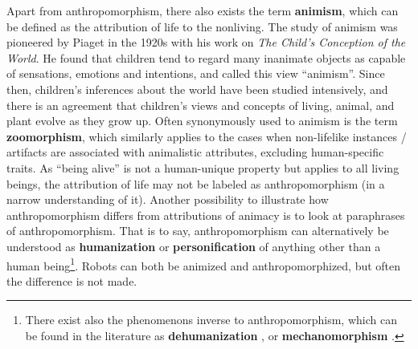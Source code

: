 \documentclass{frontiersSCNS} %
\begin{document}
Apart from anthropomorphism, there also exists the term \textbf{animism}, which
can be defined as the attribution of life to the nonliving. The study of animism
was pioneered by Piaget in the 1920s with his work on \textit{The Child's
Conception of the  World}. He found that children tend to regard many inanimate
objects as capable of sensations, emotions and intentions, and called this view
``animism''. Since then, children's inferences about the world have been studied
intensively, and there is an agreement that children's views and concepts of
living, animal, and plant evolve as they grow up. Often synonymously used to
animism is the term \textbf{zoomorphism}, which similarly applies to the cases
when non-lifelike instances / artifacts are associated with animalistic
attributes, excluding human-specific traits.  As ``being alive'' is not a
human-unique property but applies to all living beings, the attribution of life
may not be labeled as anthropomorphism (in a narrow understanding of it).
Another possibility to illustrate how anthropomorphism differs from attributions
of animacy is to look at paraphrases of anthropomorphism. That is to say,
anthropomorphism can alternatively be understood as \textbf{humanization} or
\textbf{personification} of anything other than a human being\footnote{There
exist also the phenomenons inverse to anthropomorphism, which can be found
in the literature as \textbf{dehumanization}
\citep{haslam_dehumanization:_2006}, or \textbf{mechanomorphism}
\citep{caporael_anthropomorphism_1986}.}. Robots can
both be animized and anthropomorphized, but often the difference is not made.

%
%
%  
%
\end{document}
